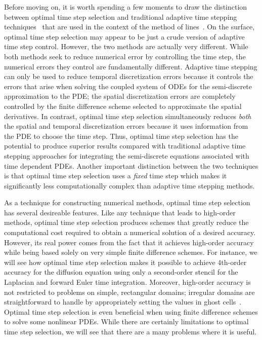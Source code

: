 \documentclass[oneeqnum,onefignum,onetabnum,onethmnum]{siamltex}
\begin{document}
Before moving on, it is worth spending a few moments to draw the distinction
between optimal time step selection and traditional adaptive time stepping 
techniques~\cite{iserles_book,??} that are used in the context of the method 
of lines~\cite{iserles_book, gko_book}.  On the surface, optimal time step 
selection may appear to be just a crude version of adaptive time step control.
However, the two methods are actually very different.  While both methods seek 
to reduce numerical error by controlling the time step, the numerical errors 
they control are fundamentally different.  Adaptive time stepping can only 
be used to reduce temporal discretization errors because it controls the 
errors that arise when solving the coupled system of ODEs for the 
semi-discrete approximation to the PDE; the spatial discretization errors 
are completely controlled by the finite difference scheme selected to 
approximate the spatial derivatives.  
In contrast, optimal time step selection simultaneously reduces 
\emph{both} the spatial and temporal discretization errors because it
uses information from the PDE to choose the time step.  Thus, optimal time 
step selection has the potential to produce superior results compared with 
traditional adaptive time stepping approaches for integrating the 
semi-discrete equations associated with time dependent PDEs.  Another 
important distinction between the two techniques is that optimal time step 
selection uses a \emph{fixed} time step which makes it significantly less 
computationally complex than adaptive time stepping methods.

As a technique for constructing numerical methods, optimal time step selection 
has several desireable features.  Like any technique that leads to high-order 
methods, optimal time step selection produces schemes that greatly reduce the 
computational cost required to obtain a numerical solution of a desired 
accuracy.  However, its real power comes from the fact that it achieves
high-order accuracy while being based solely on very simple finite difference 
schemes.  For instance, we will see how optimal time step selection makes 
it possible to achieve 4th-order accuracy for the diffusion equation using only 
a second-order stencil for the Laplacian and forward Euler time integration.  
Moreover, high-order accuracy is not restricted to problems on simple, 
rectangular domains; irregular domains are straightforward to handle by
appropriately setting the values in ghost cells~\cite{fedkiw_1999, 
osher_fedkiw_book, gibou_2005}.  Optimal time step selection is even 
beneficial when using finite difference schemes to solve some nonlinear PDEs.  
While there are certainly limitations to optimal time step selection, we will 
see that there are a many problems where it is useful.  
\end{document}
